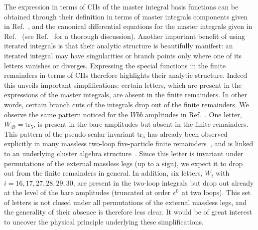 \documentclass[main.tex]{subfiles}
\begin{document}
The expression in terms of CIIs of the master integral basis functions can be obtained through their definition in terms of master integrals components given in Ref.~\cite{Badger:2021nhg}, and the canonical differential equations for the master integrals given in Ref.~\cite{Abreu:2020jxa} (see Ref.~\cite{Badger:2021nhg} for a thorough discussion). Another important benefit of using iterated integrals is that their analytic structure is beautifully manifest: an iterated integral may have singularities or branch points only where one of its letters vanishes or diverges. Expressing the special functions in the finite remainders in terms of CIIs therefore highlights their analytic structure. Indeed this unveils important simplifications: certain letters, which are present in the expressions of the master integrals, are absent in the finite remainders. In other words, certain branch cuts of the integrals drop out of the finite remainders. We observe the same pattern noticed for the $Wb\bar{b}$ amplitudes in Ref.~\cite{Badger:2021nhg}. One letter, $W_{49} = \text{tr}_5$, is present in the bare amplitudes but absent in the finite remainders. This pattern of the pseudo-scalar invariant $\text{tr}_5$ has already been observed explicitly in many massless two-loop five-particle finite remainders~\cite{Badger:2018enw,Abreu:2018zmy,Abreu:2018aqd,Chicherin:2018yne,Chicherin:2019xeg,Abreu:2019rpt,Abreu:2019odu,Badger:2019djh,Caron-Huot:2020vlo,Abreu:2020cwb,Chawdhry:2020for}, and is linked to an underlying cluster algebra structure~\cite{Chicherin:2020umh}. Since this letter is invariant under permutations of the external massless legs (up to a sign), we expect it to drop out from the finite remainders in general.
In addition, six letters, $W_i$ with $i=16,17,27,28,29,30$, are present in the two-loop integrals but drop out already at the level of the bare amplitudes (truncated at order $\epsilon^0$ at two loops). This set of letters is not closed under all permutations of the external massless legs, and the generality of their absence is therefore less clear.
It would be of great interest to uncover the physical principle underlying these simplifications.
\end{document}
